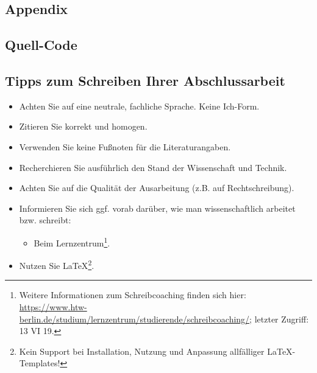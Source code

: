 \documentclass[oneside,bibliography=totocnumbered,BCOR=5mm]{scrbook}%
\theoremstyle{definition}
\theoremstyle{definition}
\theoremstyle{definition}
\theoremstyle{definition}
\theoremstyle{definition}
\theoremstyle{definition}
\begin{document}
\begin{appendix}


\chapter{Appendix}


\section{Quell-Code}

\section{Tipps zum Schreiben Ihrer Abschlussarbeit}

\begin{itemize}
\item Achten Sie auf eine neutrale, fachliche Sprache. Keine \glqq{}Ich\grqq{}-Form.
\item Zitieren Sie korrekt und homogen.
\item Verwenden Sie keine Fu{\ss}noten für die Literaturangaben.
\item Recherchieren Sie ausführlich den Stand der Wissenschaft und Technik.
\item Achten Sie auf die Qualität der Ausarbeitung (z.B. auf Rechtschreibung).
\item Informieren Sie sich ggf. vorab darüber, wie man wissenschaftlich arbeitet bzw. schreibt:
\begin{itemize}
\item Beim Lernzentrum\footnote{Weitere Informationen zum Schreibcoaching finden sich hier: \url{https://www.htw-berlin.de/studium/lernzentrum/studierende/schreibcoaching/}; letzter Zugriff: 13 VI 19.}.
\end{itemize}
\item Nutzen Sie \LaTeX\footnote{Kein Support bei Installation, Nutzung und Anpassung allfälliger \LaTeX-Templates!}.
\end{itemize}




\end{appendix}
\end{document}
